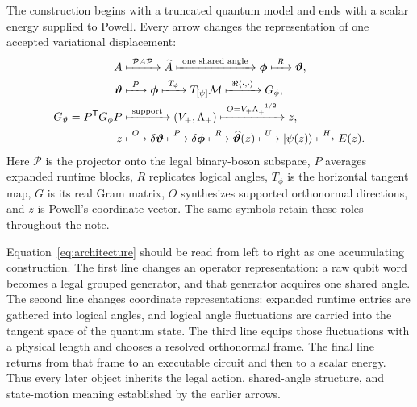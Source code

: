 \documentclass[10pt,twocolumn]{article}
\newcommand{\ket}[1]{\lvert #1\rangle}
\begin{document}
The construction begins with a truncated quantum model and ends with a scalar
energy supplied to Powell. Every arrow changes the representation of one
accepted variational displacement:
{\footnotesize
\begin{equation}
\begin{aligned}
 A
 &\xmapsto{\ \mathcal P A\mathcal P\ }
 \widetilde A
 \xmapsto{\ \text{one shared angle}\ }
 \bm\phi
 \xmapsto{\ R\ }
 \bm\vartheta,\\
 \bm\vartheta
 &\xmapsto{\ P\ }
 \bm\phi
 \xmapsto{\ T_\phi\ }
 T_{[\psi]}\mathcal M
 \xmapsto{\ \Re\langle\cdot,\cdot\rangle\ }
 G_\phi,\\
 G_\vartheta=P^{\mathsf T}G_\phi P
 &\xmapsto{\ \text{support}\ }
 (V_+,\Lambda_+)
 \xmapsto{\ O=V_+\Lambda_+^{-1/2}\ }
 z,\\
 z
 &\xmapsto{\ O\ }
 \delta\bm\vartheta
 \xmapsto{\ P\ }
 \delta\bm\phi
 \xmapsto{\ R\ }
 \widehat{\bm\vartheta}(z)
 \xmapsto{\ U\ }
 \ket{\psi(z)}
 \xmapsto{\ H}
 E(z).
\end{aligned}
\label{eq:architecture}
\end{equation}
}
Here \(\mathcal P\) is the projector onto the legal binary-boson subspace,
\(P\) averages expanded runtime blocks, \(R\) replicates logical angles,
\(T_\phi\) is the horizontal tangent map, \(G\) is its real Gram matrix,
\(O\) synthesizes supported orthonormal directions, and \(z\) is Powell's
coordinate vector. The same symbols retain these roles throughout the note.

Equation~\eqref{eq:architecture} should be read from left to right as one
accumulating construction. The first line changes an operator representation:
a raw qubit word becomes a legal grouped generator, and that generator acquires
one shared angle. The second line changes coordinate representations: expanded
runtime entries are gathered into logical angles, and logical angle
fluctuations are carried into the tangent space of the quantum state. The third
line equips those fluctuations with a physical length and chooses a resolved
orthonormal frame. The final line returns from that frame to an executable
circuit and then to a scalar energy. Thus every later object inherits the legal
action, shared-angle structure, and state-motion meaning established by the
earlier arrows.
\end{document}

